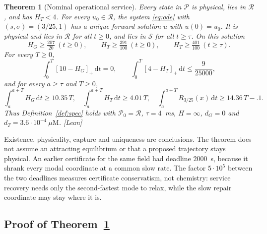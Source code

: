 \documentclass[11pt,a4paper]{article}
\theoremstyle{plain}
\newtheorem{theorem}{Theorem}[section]
\theoremstyle{definition}
\theoremstyle{remark}
\newcommand{\uM}{\ensuremath{\mu\mathrm{M}}}
\newcommand{\dd}{\,\mathrm d}
\newcommand{\HG}{H_G}
\newcommand{\HT}{H_T}
\newcommand{\RR}{\mathcal R}
\newcommand{\SSS}{\mathcal S}
\newcommand{\Pp}{\mathcal P}
\newcommand{\pos}[1]{[#1]_+}
\newcommand{\evid}[1]{\textnormal{\textsf{\small[#1]}}}
\begin{document}
\begin{theorem}[Nominal operational service]\label{thm:main}
Every state in $\Pp$ is physical, lies in $\RR$, and has $\HT<4$. For every
$u_0\in\RR$, the system \eqref{eq:ode} with $(s,\sigma)=(3/25,1)$ has a unique
forward solution $u$ with $u(0)=u_0$. It is physical and lies in $\RR$ for all
$t\ge0$, and lies in $\SSS$ for all $t\ge\tau$. On this solution
\begin{equation}\label{eq:floors}
\HG\ge\tfrac{207}{20}\ (t\ge0),\qquad \HT\ge\tfrac{391}{100}\ (t\ge0),\qquad
\HT\ge\tfrac{401}{100}\ (t\ge\tau).
\end{equation}
For every $T\ge0$,
\begin{equation}\label{eq:deficit}
\int_0^T\pos{10-\HG}\dd t=0,\qquad \int_0^T\pos{4-\HT}\dd t\le\frac{9}{25000},
\end{equation}
and for every $a\ge\tau$ and $T\ge0$,
\begin{equation}\label{eq:windows}
\int_a^{a+T}\!\HG\dd t\ge10.35\,T,\quad
\int_a^{a+T}\!\HT\dd t\ge4.01\,T,\quad
\int_a^{a+T}\!R_{3/25}(x)\dd t\ge14.36\,T-.1 .
\end{equation}
Thus Definition~\ref{def:spec} holds with $\Pp_0=\RR$, $\tau=4$~ms,
$H=\infty$, $d_G=0$ and $d_T=3.6\cdot10^{-4}~\uM$. \evid{Lean}
\end{theorem}

Existence, physicality, capture and uniqueness are conclusions. The theorem
does not assume an attracting equilibrium or that a proposed trajectory stays
physical. An earlier certificate for the same field had deadline $2000$~s,
because it shrank every modal coordinate at a common slow rate. The factor
$5\cdot10^{5}$ between the two deadlines measures certificate conservatism,
not chemistry: service recovery needs only the second-fastest mode to relax,
while the slow repair coordinate may stay where it is.

\subsection{Proof of Theorem~\ref{thm:main}}\label{sec:proof}
\end{document}
